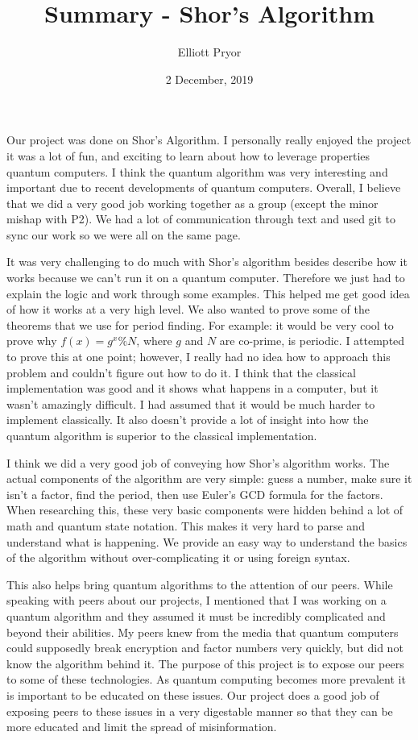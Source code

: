 \documentclass[a4paper]{article}
\title{Summary - Shor's Algorithm}
\author{Elliott Pryor}
\date{2 December, 2019}
\begin{document}
\maketitle %


Our project was done on Shor's Algorithm. I personally really enjoyed the project it was a lot of fun,
and exciting to learn about how to leverage properties quantum computers. I think the quantum algorithm was very interesting and important due to recent developments of quantum computers.
Overall, I believe that we did a very good job working together as a group (except the minor mishap with P2).
We had a lot of communication through text and used git to sync our work so we were all on the same page.

It was very challenging to do much with Shor's algorithm besides describe how it works because we can't run it on a quantum computer.
Therefore we just had to explain the logic and work through some examples. This helped me get good idea of how it works at a very high level.
We also wanted to prove some of the theorems that we use for period finding. For example: it would be very cool to prove why $f(x) = g^x \% N$,
where $g$ and $N$ are co-prime, is periodic. I attempted to prove this at one point;
however, I really had no idea how to approach this problem and couldn't figure out how to do it.
I think that the classical implementation was good and it shows what happens in a computer,
but it wasn't amazingly difficult. I had assumed that it would be much harder to implement classically.
It also doesn't provide a lot of insight into how the quantum algorithm is superior to the classical implementation.

I think we did a very good job of conveying how Shor's algorithm works. The actual components of the algorithm are very simple: guess a number,
make sure it isn't a factor, find the period, then use Euler's GCD formula for the factors.
When researching this, these very basic components were hidden behind a lot of math and quantum state notation.
This makes it very hard to parse and understand what is happening. We provide an easy way to  understand the basics of the algorithm without over-complicating it or using foreign syntax.

This also helps bring quantum algorithms to the attention of our peers. While speaking with peers about our projects,
I mentioned that I was working on a quantum algorithm and they assumed it must be incredibly complicated and beyond their abilities.
My peers knew from the media that quantum computers could supposedly break encryption and factor numbers very quickly,
but did not know the algorithm behind it. The purpose of this project is to expose our peers to some of these technologies.
As quantum computing becomes more prevalent it is important to be educated on these issues.
Our project does a good job of exposing peers to these issues in a very digestable manner so that they can be more educated and limit the spread of  misinformation.
\end{document}
